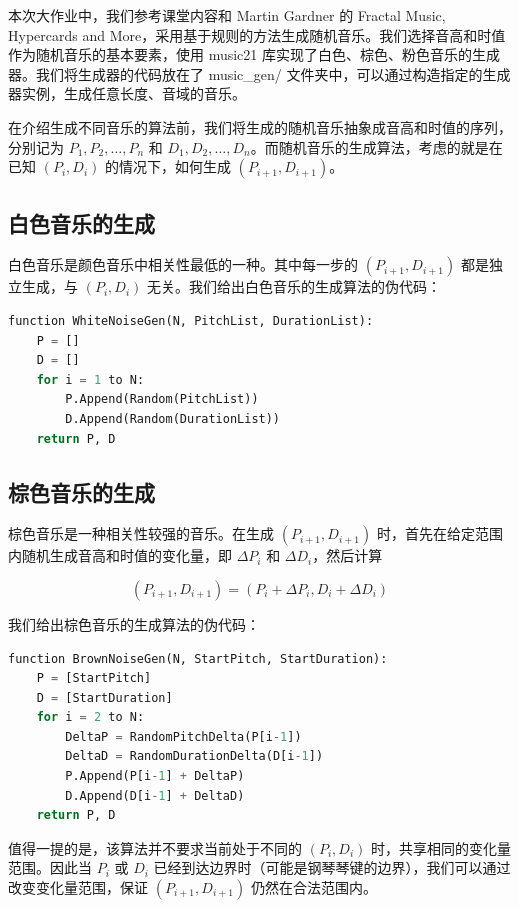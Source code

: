 \documentclass[a4paper,12pt]{article} %
\begin{document}
本次大作业中，我们参考课堂内容和 Martin Gardner 的 Fractal Music, Hypercards and More，采用基于规则的方法生成随机音乐。我们选择音高和时值作为随机音乐的基本要素，使用 music21 库实现了白色、棕色、粉色音乐的生成器。我们将生成器的代码放在了 music\_gen/ 文件夹中，可以通过构造指定的生成器实例，生成任意长度、音域的音乐。

在介绍生成不同音乐的算法前，我们将生成的随机音乐抽象成音高和时值的序列，分别记为 $P_1, P_2, \ldots, P_n$ 和 $D_1, D_2, \ldots, D_n$。而随机音乐的生成算法，考虑的就是在已知 $(P_i, D_i)$ 的情况下，如何生成 $(P_{i+1}, D_{i+1})$。

\subsection{白色音乐的生成}

白色音乐是颜色音乐中相关性最低的一种。其中每一步的 $(P_{i+1}, D_{i+1})$ 都是独立生成，与 $(P_i, D_i)$ 无关。我们给出白色音乐的生成算法的伪代码：
\begin{lstlisting}[language=python]
function WhiteNoiseGen(N, PitchList, DurationList):
    P = []
    D = []
    for i = 1 to N:
        P.Append(Random(PitchList))
        D.Append(Random(DurationList))
    return P, D
\end{lstlisting}

\subsection{棕色音乐的生成}

棕色音乐是一种相关性较强的音乐。在生成 $(P_{i+1}, D_{i+1})$ 时，首先在给定范围内随机生成音高和时值的变化量，即 $\Delta P_i$ 和 $\Delta D_i$，然后计算

$$(P_{i+1}, D_{i+1}) = (P_i + \Delta P_i, D_i + \Delta D_i)$$

我们给出棕色音乐的生成算法的伪代码：
\begin{lstlisting}[language=python]
function BrownNoiseGen(N, StartPitch, StartDuration):
    P = [StartPitch]
    D = [StartDuration]
    for i = 2 to N:
        DeltaP = RandomPitchDelta(P[i-1])
        DeltaD = RandomDurationDelta(D[i-1])
        P.Append(P[i-1] + DeltaP)
        D.Append(D[i-1] + DeltaD)
    return P, D
\end{lstlisting}
值得一提的是，该算法并不要求当前处于不同的 $(P_i, D_i)$ 时，共享相同的变化量范围。因此当 $P_i$ 或 $D_i$ 已经到达边界时（可能是钢琴琴键的边界），我们可以通过改变变化量范围，保证 $(P_{i+1}, D_{i+1})$ 仍然在合法范围内。
\end{document}
